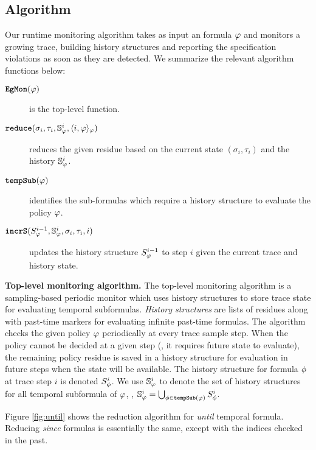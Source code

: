 

\subsection{\monitor Algorithm}
Our runtime monitoring algorithm \monitor takes as input an \planguage formula $\policy$ and monitors a growing trace, building history structures and reporting the specification violations as soon as they are detected. We summarize the relevant algorithm functions below:

\begin{description}
\item[$\monitor{}(\policy)$] is the top-level function. 
\item[$\reduce(\sigma_i, \tau_i, \histSt{i}, \rpt{i}{\policy}{\policy})$] reduces the given residue based on the current state $(\sigma_i,\tau_i)$ and the history $\histSt{i}$.
\item[$\tempSub(\policy)$] identifies the sub-formulas which require a history structure to evaluate the policy $\policy$.
\item[$\incrS(\histst{i-1}, \histSt{i}, \sigma_i, \tau_i, i)$] updates the history structure $\histst{i-1}$ to step $i$ given the current trace and history state.
\end{description}




\textbf{Top-level monitoring algorithm.}
The top-level monitoring algorithm \monitor is a sampling-based periodic monitor which uses history structures to store trace state for evaluating temporal subformulas. 
\emph{History structures} are lists of residues along with past-time markers for evaluating infinite past-time formulas. 
The algorithm checks the given policy $\policy$ periodically at every trace sample step. 
When the policy cannot be decided at a given step (\eg, it requires future state to evaluate), the remaining policy residue is saved in a history structure for evaluation in future steps when the state will be available. 
The history structure for formula $\policyv$ at trace step $i$ is denoted $\histst[\policyv]{i}$. 
We use $\histSt[\policy]{i}$ to denote the set of history structures for all temporal subformula of $\policy$, \ie, 
$\histSt[\policy]{i} = \bigcup_{\policyv \in \tempSub(\policy)} \histst[\policyv]{i}$.

Figure \ref{fig:until} shows the reduction algorithm for \emph{until} temporal formula. Reducing \emph{since} formulas is essentially the same, except with the indices checked in the past.


